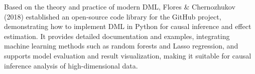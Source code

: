 Based on the theory and practice of modern DML, Flores \& Chernozhukov (2018) established an open-source code library for the GitHub project, demonstrating how to implement DML in Python for causal inference and effect estimation. It provides detailed documentation and examples, integrating machine learning methods such as random forests and Lasso regression, and supports model evaluation and result visualization, making it suitable for causal inference analysis of high-dimensional data.